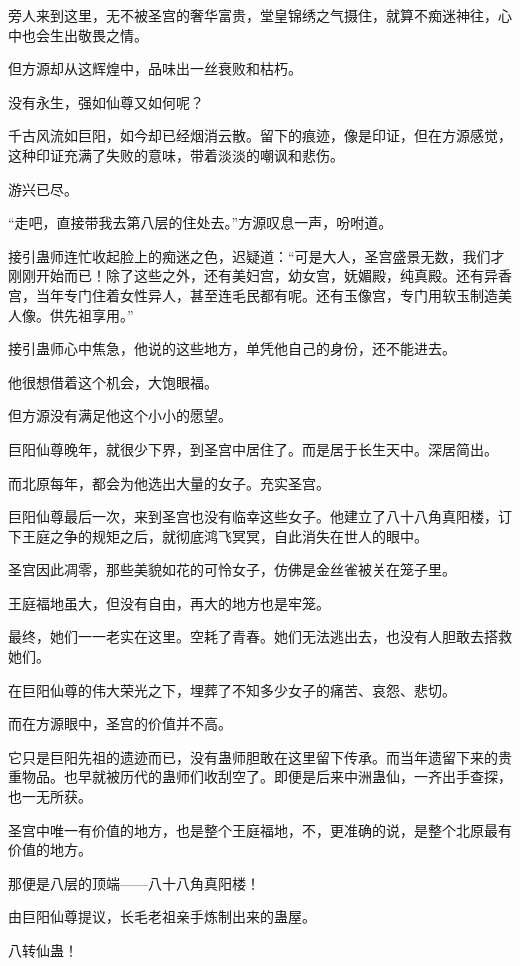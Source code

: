 \begin{this_body}
旁人来到这里，无不被圣宫的奢华富贵，堂皇锦绣之气摄住，就算不痴迷神往，心中也会生出敬畏之情。

但方源却从这辉煌中，品味出一丝衰败和枯朽。

没有永生，强如仙尊又如何呢？

千古风流如巨阳，如今却已经烟消云散。留下的痕迹，像是印证，但在方源感觉，这种印证充满了失败的意味，带着淡淡的嘲讽和悲伤。

游兴已尽。

“走吧，直接带我去第八层的住处去。”方源叹息一声，吩咐道。

接引蛊师连忙收起脸上的痴迷之色，迟疑道：“可是大人，圣宫盛景无数，我们才刚刚开始而已！除了这些之外，还有美妇宫，幼女宫，妩媚殿，纯真殿。还有异香宫，当年专门住着女性异人，甚至连毛民都有呢。还有玉像宫，专门用软玉制造美人像。供先祖享用。”

接引蛊师心中焦急，他说的这些地方，单凭他自己的身份，还不能进去。

他很想借着这个机会，大饱眼福。

但方源没有满足他这个小小的愿望。

巨阳仙尊晚年，就很少下界，到圣宫中居住了。而是居于长生天中。深居简出。

而北原每年，都会为他选出大量的女子。充实圣宫。

巨阳仙尊最后一次，来到圣宫也没有临幸这些女子。他建立了八十八角真阳楼，订下王庭之争的规矩之后，就彻底鸿飞冥冥，自此消失在世人的眼中。

圣宫因此凋零，那些美貌如花的可怜女子，仿佛是金丝雀被关在笼子里。

王庭福地虽大，但没有自由，再大的地方也是牢笼。

最终，她们一一老实在这里。空耗了青春。她们无法逃出去，也没有人胆敢去搭救她们。

在巨阳仙尊的伟大荣光之下，埋葬了不知多少女子的痛苦、哀怨、悲切。

而在方源眼中，圣宫的价值并不高。

它只是巨阳先祖的遗迹而已，没有蛊师胆敢在这里留下传承。而当年遗留下来的贵重物品。也早就被历代的蛊师们收刮空了。即便是后来中洲蛊仙，一齐出手查探，也一无所获。

圣宫中唯一有价值的地方，也是整个王庭福地，不，更准确的说，是整个北原最有价值的地方。

那便是八层的顶端——八十八角真阳楼！

由巨阳仙尊提议，长毛老祖亲手炼制出来的蛊屋。

八转仙蛊！


\end{this_body}
